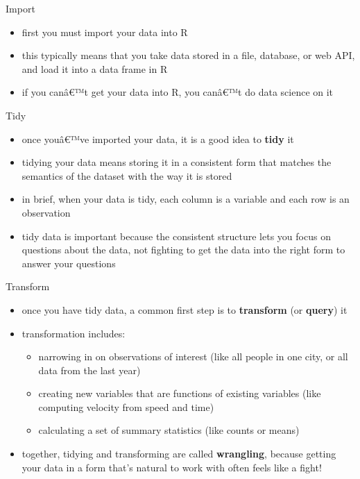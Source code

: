 \documentclass[
  ignorenonframetext,
]{beamer}
\providecommand{\tightlist}{%
  \setlength{\itemsep}{0pt}\setlength{\parskip}{0pt}}
\begin{document}
\begin{frame}{Import}
\protect\hypertarget{import}{}
\begin{itemize}[<+->]
\tightlist
\item
  first you must import your data into R
\item
  this typically means that you take data stored in a file, database, or
  web API, and load it into a data frame in R
\item
  if you canâ€™t get your data into R, you canâ€™t do data science on it
\end{itemize}
\end{frame}

\begin{frame}{Tidy}
\protect\hypertarget{tidy}{}
\begin{itemize}[<+->]
\tightlist
\item
  once youâ€™ve imported your data, it is a good idea to \textbf{tidy}
  it
\item
  tidying your data means storing it in a consistent form that matches
  the semantics of the dataset with the way it is stored
\item
  in brief, when your data is tidy, each column is a variable and each
  row is an observation
\item
  tidy data is important because the consistent structure lets you focus
  on questions about the data, not fighting to get the data into the
  right form to answer your questions
\end{itemize}
\end{frame}

\begin{frame}{Transform}
\protect\hypertarget{transform}{}
\begin{itemize}[<+->]
\tightlist
\item
  once you have tidy data, a common first step is to \textbf{transform}
  (or \textbf{query}) it
\item
  transformation includes:

  \begin{itemize}[<+->]
  \tightlist
  \item
    narrowing in on observations of interest (like all people in one
    city, or all data from the last year)
  \item
    creating new variables that are functions of existing variables
    (like computing velocity from speed and time)
  \item
    calculating a set of summary statistics (like counts or means)
  \end{itemize}
\item
  together, tidying and transforming are called \textbf{wrangling},
  because getting your data in a form that's natural to work with often
  feels like a fight!
\end{itemize}
\end{frame}
\end{document}

